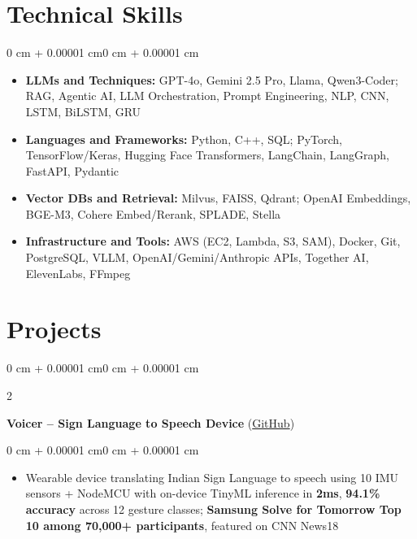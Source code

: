 \documentclass[10pt, letterpaper]{article}
\newenvironment{highlights}{
    \begin{itemize}[
        topsep=0.01 cm,
        parsep=0.01 cm,
        partopsep=0pt,
        itemsep=0pt,
        leftmargin=0 cm + 10pt
    ]
}{
    \end{itemize}
}
\newenvironment{highlightsforbulletentries}{
    \begin{itemize}[
        topsep=0.01 cm,
        parsep=0.01 cm,
        partopsep=0pt,
        itemsep=0pt,
        leftmargin=10pt
    ]
}{
    \end{itemize}
}
\newenvironment{onecolentry}{
    \begin{adjustwidth}{0 cm + 0.00001 cm}{0 cm + 0.00001 cm}
}{
    \end{adjustwidth}
}
\newenvironment{twocolentry}[2][]{
    \onecolentry
    \def\secondColumn{#2}
    \setcolumnwidth{\fill, 5.5 cm}
    \begin{paracol}{2}
}{
    \switchcolumn \raggedleft \secondColumn
    \end{paracol}
    \endonecolentry
}
\let\hrefWithoutArrow\href
\begin{document}
    \section{Technical Skills}

    \begin{onecolentry}
        \begin{highlightsforbulletentries}
            \item \textbf{LLMs and Techniques:} GPT-4o, Gemini 2.5 Pro, Llama, Qwen3-Coder; RAG, Agentic AI, LLM Orchestration, Prompt Engineering, NLP, CNN, LSTM, BiLSTM, GRU
            \item \textbf{Languages and Frameworks:} Python, C++, SQL; PyTorch, TensorFlow/Keras, Hugging Face Transformers, LangChain, LangGraph, FastAPI, Pydantic
            \item \textbf{Vector DBs and Retrieval:} Milvus, FAISS, Qdrant; OpenAI Embeddings, BGE-M3, Cohere Embed/Rerank, SPLADE, Stella
            \item \textbf{Infrastructure and Tools:} AWS (EC2, Lambda, S3, SAM), Docker, Git, PostgreSQL, VLLM, OpenAI/Gemini/Anthropic APIs, Together AI, ElevenLabs, FFmpeg
        \end{highlightsforbulletentries}
    \end{onecolentry}

    \section{Projects}

        \begin{twocolentry}{
            2023
        }
            \textbf{Voicer -- Sign Language to Speech Device} (\hrefWithoutArrow{https://github.com/amit-gohel/voicer}{GitHub})
        \end{twocolentry}

        \vspace{0.02 cm}
        \begin{onecolentry}
            \begin{highlights}
                \item Wearable device translating Indian Sign Language to speech using 10 IMU sensors + NodeMCU with on-device TinyML inference in \textbf{2ms}, \textbf{94.1\% accuracy} across 12 gesture classes; \textbf{Samsung Solve for Tomorrow Top 10 among 70,000+ participants}, featured on CNN News18
            \end{highlights}
        \end{onecolentry}
\end{document}
